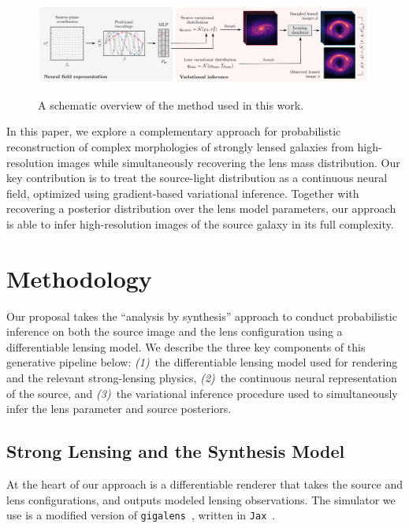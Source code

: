 \documentclass[nohyperref]{article}
\theoremstyle{plain}
\theoremstyle{definition}
\theoremstyle{remark}
\begin{document}
\begin{figure}[!t]
\centering
\includegraphics[width=0.99\textwidth]{figures/figure.pdf} \\
\caption{A schematic overview of the method used in this work.}\label{fig:figure}
\end{figure}

In this paper, we explore a complementary approach for probabilistic reconstruction of complex morphologies of strongly lensed galaxies from high-resolution images while simultaneously recovering the lens mass distribution. Our key contribution is to treat the source-light distribution as a continuous neural field, optimized using gradient-based variational inference. Together with recovering a posterior distribution over the lens model parameters, our approach is able to infer high-resolution images of the source galaxy in its full complexity.

\section{Methodology}
\label{sec:method}

Our proposal takes the ``analysis by synthesis'' approach to conduct probabilistic inference on both the source image and the lens configuration using a differentiable lensing model. We describe the three key components of this generative pipeline below: \emph{(1)}~the differentiable lensing model used for rendering and the relevant strong-lensing physics, \emph{(2)}~the continuous neural representation of the source, and \emph{(3)}~the variational inference procedure used to simultaneously infer the lens parameter and source posteriors.


\subsection{Strong Lensing and the Synthesis Model}

At the heart of our approach is a differentiable renderer that takes the source and lens configurations, and outputs modeled lensing observations. The simulator we use is a modified version of \texttt{gigalens}~\cite{gu2022giga}, written in \texttt{Jax}~\cite{jax2018github}. 
\end{document}
